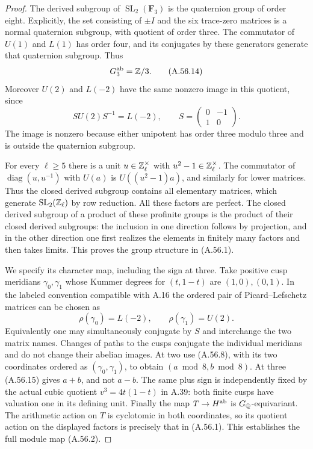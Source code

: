 \begin{proof}
The derived subgroup of $\operatorname{SL}_2(\mathbf F_3)$
is the quaternion group of order eight.  Explicitly, the set
consisting of $\pm I$ and the six trace-zero matrices is a
normal quaternion subgroup, with quotient of order three.
The commutator of $U(1)$ and $L(1)$ has order four, and its
conjugates by these generators generate that quaternion
subgroup.  Thus
\[
                G_3^{\rm ab}=\mathbb Z/3.
\tag{A.56.14}
\]
Moreover $U(2)$ and $L(-2)$ have the same nonzero image in
this quotient, since
\[
 S U(2)S^{-1}=L(-2),\qquad
                      S=\begin{pmatrix}0&-1\\1&0\end{pmatrix}.
\tag{A.56.15}
\]
The image is nonzero because either unipotent has order three
modulo three and is outside the quaternion subgroup.

For every $\ell\ge5$ there is a unit $u\in\mathbb Z_\ell^\times$
with $u^2-1\in\mathbb Z_\ell^\times$.  The commutator of
$\operatorname{diag}(u,u^{-1})$ with $U(a)$ is
$U((u^2-1)a)$, and similarly for lower matrices.  Thus the
closed derived subgroup contains all elementary matrices,
which generate $\operatorname{SL}_2(\mathbb Z_\ell)$ by row
reduction.  All these factors are perfect.
The closed derived subgroup of a product of these profinite
groups is the product of their closed derived subgroups:
the inclusion in one direction follows by projection, and
in the other direction one first realizes the elements in
finitely many factors and then takes limits.  This proves
the group structure in (A.56.1).

We specify its character map, including the sign at three.
Take positive cusp meridians $\gamma_0,\gamma_1$ whose
Kummer degrees for $(t,1-t)$ are $(1,0),(0,1)$.
In the labeled convention compatible with A.16 the ordered
pair of Picard--Lefschetz matrices can be chosen as
\[
                \rho(\gamma_0)=L(-2),\qquad
                \rho(\gamma_1)=U(2).
\tag{A.56.16}
\]
Equivalently one may simultaneously conjugate by $S$ and
interchange the two matrix names.  Changes of paths to the
cusps conjugate the individual meridians and do not change
their abelian images.  At two use (A.56.8), with its two
coordinates ordered as $(\gamma_0,\gamma_1)$, to obtain
$(a\bmod8,b\bmod8)$.  At three (A.56.15) gives $a+b$,
and not $a-b$.  The same plus sign is independently fixed by
the actual cubic quotient $v^3=4t(1-t)$ in A.39: both finite
cusps have valuation one in its defining unit.
Finally the map $T\to H^{\rm ab}$ is $G_\mathbb Q$-equivariant.
The arithmetic action on $T$ is cyclotomic in both
coordinates, so its quotient action on the displayed
factors is precisely that in (A.56.1).  This establishes
the full module map (A.56.2).


\end{proof}
